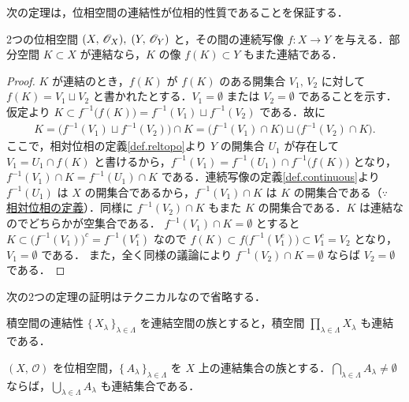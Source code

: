 \documentclass[geometry_main]{subfiles}
\begin{document}
次の定理は，位相空間の連結性が位相的性質であることを保証する．
\begin{mytheo}[label=thm.connect]{}
	2つの位相空間 $(X,\, \mathscr{O}_{X}),\; (Y,\, \mathscr{O}_{Y})$ と，その間の連続写像 $f \colon X \to Y$ を与える．部分空間 $K \subset X$ が連結なら，$K$ の像 $f(K) \subset Y$ もまた連結である．
\end{mytheo}

\begin{proof}
	$K$ が連結のとき，$f(K)$ が $f(K)$ のある開集合 $V_1,\, V_2$ に対して $f(K) = V_1 \sqcup V_2$ と書かれたとする．$V_1 = \emptyset$ または $V_2 = \emptyset$ であることを示す．
	仮定より $K \subset f^{-1} \bigl(f(K)\bigr) = f^{-1}(V_1) \sqcup f^{-1}(V_2)$ である．故に
	\begin{align}
		K = \bigl(f^{-1}(V_1)\sqcup f^{-1} (V_2)\bigr)\cap K = \bigl(f^{-1}(V_1) \cap K\bigr) \sqcup \bigl(f^{-1} (V_2) \cap K\bigr).
	\end{align}
	ここで，相対位相の定義\ref{def.reltopo}より $Y$ の開集合 $U_1$ が存在して $V_1 = U_1 \cap f(K)$ と書けるから，$f^{-1}(V_1) = f^{-1}(U_1) \cap f^{-1}\bigl(f(K)\bigr)$ となり，$f^{-1}(V_1) \cap K = f^{-1}(U_1) \cap K$ である．連続写像の定義\ref{def.continuous}より $f^{-1}(U_1)$ は $X$ の開集合であるから，$f^{-1}(V_1) \cap K$ は $K$ の開集合である（$\because\;$ \hyperref[def.reltopo]{相対位相の定義}）．同様に $f^{-1}(V_2) \cap K$ もまた $K$ の開集合である．$K$ は連結なのでどちらかが空集合である．
	$f^{-1}(V_1) \cap K = \emptyset$ とすると $K \subset \bigl(f^{-1}(V_1)\bigr)^c = f^{-1} (V_1^c)$ なので $f(K) \subset f\bigl(f^{-1}(V_1^c)\bigr) \subset V_1^c = V_2$ となり，$V_1 = \emptyset$ である．
	また，全く同様の議論により $f^{-1}(V_2) \cap K = \emptyset$ ならば $V_2 = \emptyset$ である．
\end{proof}

次の2つの定理の証明はテクニカルなので省略する．

\begin{mytheo}{積空間の連結性}
	$\bigl\{\, X_\lambda \,\bigr\}_{\lambda \in \Lambda}$ を連結空間の族とすると，積空間 $\prod_{\lambda \in \Lambda} X_\lambda$ も連結である．
\end{mytheo}

\begin{mytheo}[label=thm.unionc]{}
	$(X,\, \mathscr{O})$ を位相空間，$\bigl\{\, A_\lambda \,\bigr\}_{\lambda \in \Lambda}$ を $X$ 上の連結集合の族とする．$\bigcap_{\lambda \in \Lambda} A_\lambda \neq \emptyset$ ならば，$\bigcup_{\lambda \in \Lambda} A_\lambda$ も連結集合である． 
\end{mytheo}
\end{document}
